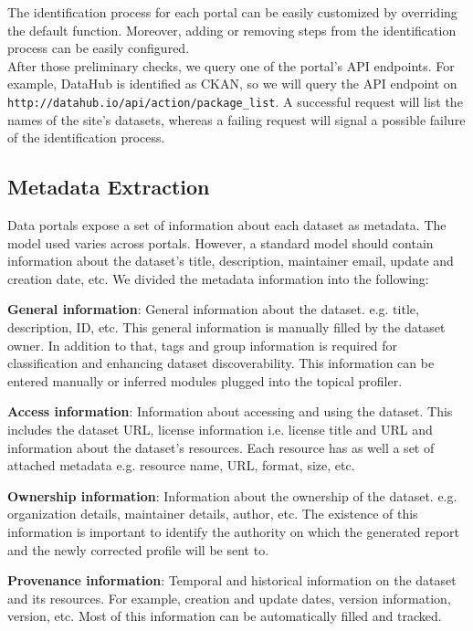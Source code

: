\documentclass[runningheads,a4paper]{llncs}
\begin{document}
The identification process for each portal can be easily customized by overriding the default function. Moreover, adding or removing steps from the identification process can be easily configured.\\
After those preliminary checks, we query one of the portal's API endpoints. For example, DataHub is identified as CKAN, so we will query the API endpoint on \texttt{http://datahub.io/api/action/package\_list}. A successful request will list the names of the site's datasets, whereas a failing request will signal a possible failure of the identification process.

\subsection{Metadata Extraction}

Data portals expose a set of information about each dataset as metadata. The model used varies across portals. However, a standard model should contain information about the dataset's title, description, maintainer email, update and creation date, etc. We divided the metadata information into the following:

\textbf{General information}: General information about the dataset. e.g. title, description, ID, etc. This general information is manually filled by the dataset owner. In addition to that, tags and group information is required for classification and enhancing dataset discoverability. This information can be entered manually or inferred modules plugged into the topical profiler.

\textbf{Access information}: Information about accessing and using the dataset. This includes the dataset URL, license information i.e. license title and URL and information about the dataset's resources. Each resource has as well a set of attached metadata e.g. resource name, URL, format, size, etc.

\textbf{Ownership information}: Information about the ownership of the dataset. e.g. organization details, maintainer details, author, etc. The existence of this information is important to identify the authority on which the generated report and the newly corrected profile will be sent to.

\textbf{Provenance information}: Temporal and historical information on the dataset and its resources. For example, creation and update dates, version information, version, etc. Most of this information can be automatically filled and tracked.
\end{document}
